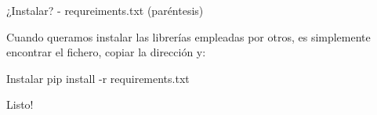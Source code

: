 \begin{frame}[t]{¿Instalar? - requreiments.txt (par\'entesis)}\vspace{0pt}

Cuando queramos instalar las librer\'ias empleadas por otros, es simplemente encontrar el fichero, copiar la direcci\'on y:

\begin{block}{Instalar}
	pip install -r requirements.txt
\end{block}

Listo!




\end{frame}